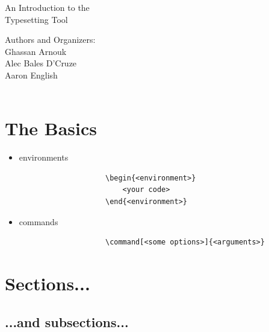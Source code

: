 \documentclass[hidelinks, 12pt]{article}%
\begin{document}
    \begin{center}
        \vspace*{1cm}
        {\fontsize{300}{50}\selectfont {\bfseries Hello \LaTeX\\}}
        \vspace{3cm}
        {\LARGE An Introduction to the\\
            Typesetting Tool\\}
        \vspace{8cm}
    \end{center}
    \begin{flushright}
        Authors and Organizers:\\
        Ghassan Arnouk\\
        Alec Bales D'Cruze\\
        Aaron English\\
        \\
    \end{flushright}
    \thispagestyle{empty}

    \clearpage
    \tableofcontents
    \clearpage
    \section{The Basics}
        \begin{itemize}
            \item environments
                \begin{verbatim}
                    \begin{<environment>}
                        <your code>
                    \end{<environment>}
                \end{verbatim}
            \item commands
                \begin{verbatim}
                    \command[<some options>]{<arguments>}
                \end{verbatim}
        \end{itemize}

    \section{Sections...}
        \subsection{...and subsections...}
\end{document}
